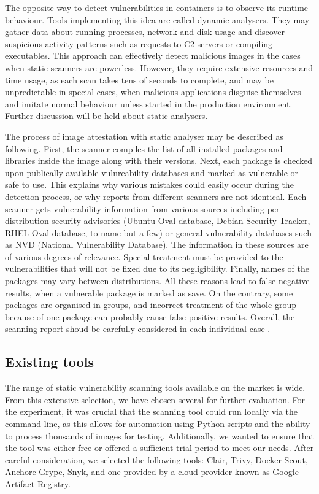 The opposite way to detect vulnerabilities in containers is to observe its runtime behaviour. Tools implementing this idea are called dynamic analysers. They may gather data about running processes, network and disk usage and discover suspicious activity patterns such as requests to C2 servers or compiling executables. This approach can effectively detect malicious images in the cases when static scanners are powerless. However, they require extensive resources and time usage, as each scan takes tens of seconds to complete, and may be unpredictable in special cases, when malicious applications disguise themselves and imitate normal behaviour unless started in the production environment. Further discussion will be held about static analysers.

The process of image attestation with static analyser may be described as following. First, the scanner compiles the list of all installed packages and libraries inside the image along with their versions. Next, each package is checked upon publically available vulnreability databases and marked as vulnerable or safe to use. This explains why various mistakes could easily occur during the detection process, or why reports from different scanners are not identical. Each scanner gets vulnerability information from various sources including per-distribution security advisories (Ubuntu Oval database, Debian Security Tracker, RHEL Oval database, to name but a few) or general vulnerability databases such as NVD (National Vulnerability Database). The information in these sources are of various degrees of relevance. Special treatment must be provided to the vulnerabilities that will not be fixed due to its negligibility. Finally, names of the packages may vary between distributions. All these reasons lead to false negative results, when a vulnerable package is marked as save. On the contrary, some packages are organised in groups, and incorrect treatment of the whole group because of one package can probably cause false positive results. Overall, the scanning report shoud be carefully considered in each individual case \cite{book:rice}.

\clearpage
\subsection{Existing tools}

The range of static vulnerability scanning tools available on the market is wide. From this extensive selection, we have chosen several for further evaluation. For the experiment, it was crucial that the scanning tool could run locally via the command line, as this allows for automation using Python scripts and the ability to process thousands of images for testing. Additionally, we wanted to ensure that the tool was either free or offered a sufficient trial period to meet our needs. After careful consideration, we selected the following tools: Clair, Trivy, Docker Scout, Anchore Grype, Snyk, and one provided by a cloud provider known as Google Artifact Registry.

